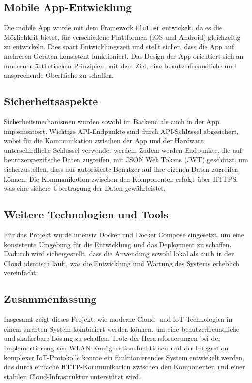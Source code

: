 \subsection{Mobile App-Entwicklung}
Die mobile App wurde mit dem Framework \texttt{Flutter} entwickelt, da es die Möglichkeit bietet, 
für verschiedene Plattformen (iOS und Android) gleichzeitig zu entwickeln. Dies spart 
Entwicklungszeit und stellt sicher, dass die App auf mehreren Geräten konsistent funktioniert. 
Das Design der App orientiert sich an modernen ästhetischen Prinzipien, mit dem Ziel, eine 
benutzerfreundliche und ansprechende Oberfläche zu schaffen.

\subsection{Sicherheitsaspekte}
Sicherheitsmechanismen wurden sowohl im Backend als auch in der App implementiert. Wichtige 
API-Endpunkte sind durch API-Schlüssel abgesichert, wobei für die Kommunikation zwischen der App 
und der Hardware unterschiedliche Schlüssel verwendet werden. Zudem werden Endpunkte, die auf 
benutzerspezifische Daten zugreifen, mit JSON Web Tokens (JWT) geschützt, um sicherzustellen, 
dass nur autorisierte Benutzer auf ihre eigenen Daten zugreifen können. Die Kommunikation zwischen 
den Komponenten erfolgt über HTTPS, was eine sichere Übertragung der Daten gewährleistet.

\subsection{Weitere Technologien und Tools}
Für das Projekt wurde intensiv Docker und Docker Compose eingesetzt, um eine konsistente Umgebung 
für die Entwicklung und das Deployment zu schaffen. Dadurch wird sichergestellt, dass die Anwendung 
sowohl lokal als auch in der Cloud identisch läuft, was die Entwicklung und Wartung des Systems 
erheblich vereinfacht.

\subsection{Zusammenfassung} %

Insgesamt zeigt dieses Projekt, wie moderne Cloud- und IoT-Technologien in einem smarten System 
kombiniert werden können, um eine benutzerfreundliche und skalierbare Lösung zu schaffen. Trotz der 
Herausforderungen bei der Implementierung von WLAN-Konfigurationsfunktionen und der Integration 
komplexer IoT-Protokolle konnte ein funktionierendes System entwickelt werden, das durch einfache 
HTTP-Kommunikation zwischen den Komponenten und einer stabilen Cloud-Infrastruktur unterstützt wird.